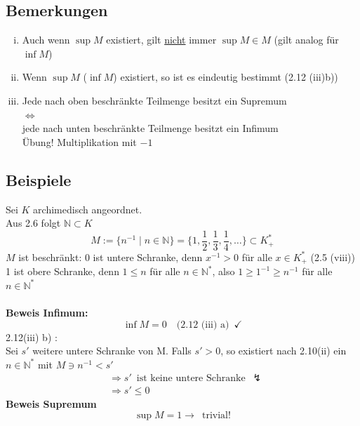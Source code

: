 \subsection{Bemerkungen} %
\label{sub:bemerkungen}
\begin{enumerate}[(i)]
	\item Auch wenn $\sup M$ existiert, gilt \underline{nicht} immer $\sup M \in M$ (gilt analog für $\inf M$)
	\item Wenn $\sup M$ ($\inf M$) existiert, so ist es eindeutig bestimmt \big(2.12 (iii)b)\big)
	\item Jede nach oben beschränkte Teilmenge besitzt ein Supremum \\
	$\Leftrightarrow$ \\
	jede nach unten beschränkte Teilmenge besitzt ein Infimum \\
	{\small Übung! Multiplikation mit $-1$}
\end{enumerate}

\subsection{Beispiele} %
\label{sub:beispiele}
Sei $K$ archimedisch angeordnet. \\
Aus 2.6 folgt $\mathds{N} \subset K$
\[
	M:= \big\{n^{-1} \mid n \in \mathds{N} \big\} = \bigg\{1, \frac{1}{2}, \frac{1}{3}, \frac{1}{4}, \ldots \bigg\} \subset K_+^*
\]
$M$ ist beschränkt: $0$ ist untere Schranke, denn $x ^{-1} >0 $ für alle $x \in K_+^*$ \big(2.5 (viii)\big)\\
1 ist obere Schranke, denn $1 \leq n$ für alle $n \in \mathds{N}^*$, also $1 \geq 1 ^{-1} \geq n ^{-1}$ für alle $n \in \mathds{N}^*$ \\
\vspace{\baselineskip} \\
\textbf{Beweis Infimum:}
\[
	\inf M = 0 \quad (\text{2.12 (iii) a)} \enspace \checkmark
\]
2.12(iii) b) : \\
Sei $s'$ weitere untere Schranke von M. Falls $s' > 0$, so existiert nach 2.10(ii) ein $n \in \mathds{N}^*$ mit 
$ M \ni n ^{-1} < s' $ 
\begin{align*}
	&\Rightarrow s' \enspace \text{ist keine untere Schranke} \enspace \lightning \\
	&\Rightarrow s' \leq 0
\end{align*}
\textbf{Beweis Supremum}
\[
	\sup M = 1 \longrightarrow \enspace \text{trivial!}
\]

